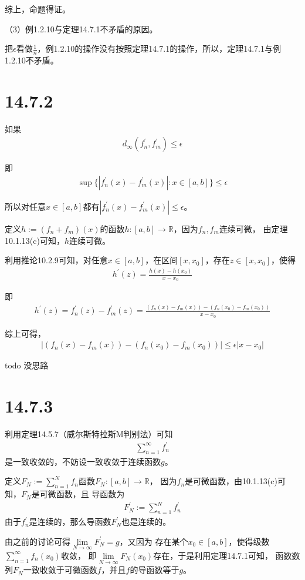 \documentclass{article}
\begin{document}
综上，命题得证。

（3）例1.2.10与定理14.7.1不矛盾的原因。

把$\epsilon$看做$\frac{1}{n}$，例1.2.10的操作没有按照定理14.7.1的操作，所以，定理14.7.1与例1.2.10不矛盾。

\section*{14.7.2}

如果
\begin{align*}
  d_{\infty}(f_n^\prime, f_m^\prime) \leq \epsilon 
\end{align*}

即
\begin{align*}
  \sup\{|f_n^\prime(x) - f_m^\prime(x)|: x \in [a, b]\} \leq \epsilon
\end{align*}

所以对任意$x \in [a, b]$都有$|f_n^\prime(x) - f_m^\prime(x)| \leq \epsilon$。

定义$h := (f_n + f_m)(x)$的函数$h : [a, b] \to \mathbb{R}$，因为$f_n, f_m$连续可微，
由定理10.1.13(c)可知，$h$连续可微。

利用推论10.2.9可知，对任意$x \in [a, b]$，在区间$[x, x_0]$，存在$z \in [x, x_0]$，使得
\begin{align*}
  h^\prime(z) = \frac{h(x) - h(x_0)}{x - x_0}
\end{align*}

即
\begin{align*}
  h^\prime(z) = f_n^\prime(z) - f_m^\prime(z) = \frac{(f_n(x) - f_m(x)) - (f_n(x_0) - f_m(x_0))}{x - x_0}
\end{align*}

综上可得，
\begin{align*}
  \left| (f_n(x) - f_m(x)) - (f_n(x_0) - f_m(x_0))\right|  \leq \epsilon|x - x_0|
\end{align*}

todo 没思路

\section*{14.7.3}

利用定理14.5.7（威尔斯特拉斯M判别法）可知
\begin{align*}
  \sum \limits_{n = 1}^\infty f_n^\prime
\end{align*}
是一致收敛的，不妨设一致收敛于连续函数$g$。

定义$F_N := \sum\limits_{n = 1}^N f_n$函数$F_N: [a, b] \to \mathbb{R}$，
因为$f_n$是可微函数，由10.1.13(c)可知，$F_N$是可微函数，且
导函数为
\begin{align*}
  F_N^\prime := \sum\limits_{n = 1}^N f_n^\prime
\end{align*}
由于$f_n^\prime$是连续的，那么导函数$F_N^\prime$也是连续的。

由之前的讨论可得$\lim\limits_{N \to \infty} F_N^\prime = g$，又因为
存在某个$x_0 \in [a, b]$，使得级数$\sum\limits_{n = 1}^\infty f_n(x_0)$收敛，
即$\lim\limits_{N \to \infty} F_N(x_0)$存在，于是利用定理14.7.1可知，
函数数列$F_N$一致收敛于可微函数$f$，并且$f$的导函数等于$g$。
\end{document}

